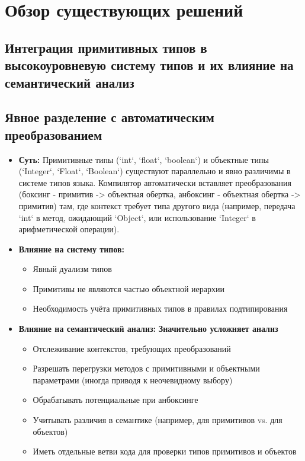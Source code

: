 \section{Обзор существующих решений}
\label{sec:Chapter2} 

\subsection*{Интеграция примитивных типов в высокоуровневую систему типов и их влияние на семантический анализ}

\subsection{Явное разделение с автоматическим преобразованием}

\begin{itemize}[label={--}]
    \item \textbf{Суть:} Примитивные типы (`int`, `float`, `boolean`) и объектные типы (`Integer`, `Float`, `Boolean`) существуют параллельно и явно различимы в системе типов языка. Компилятор автоматически вставляет преобразования (боксинг - примитив -> объектная обертка, анбоксинг - объектная обертка -> примитив) там, где контекст требует типа другого вида (например, передача `int` в метод, ожидающий `Object`, или использование `Integer` в арифметической операции).

    \item \textbf{Влияние на систему типов:}
    \begin{itemize}
        \item Явный дуализм типов
        \item Примитивы не являются частью объектной иерархии
        \item Необходимость учёта примитивных типов в правилах подтипирования
    \end{itemize}

    \item \textbf{Влияние на семантический анализ:}
    \textbf{Значительно усложняет анализ}
    \begin{itemize}[label={--}]
        \item Отслеживание контекстов, требующих преобразований
        \item Разрешать перегрузки методов с примитивными и объектными параметрами (иногда приводя к неочевидному выбору)
        \item Обрабатывать потенциальные  при анбоксинге 
        \item Учитывать различия в семантике (например,  \code{==} для примитивов vs. для объектов)
        \item Иметь отдельные ветви кода для проверки типов примитивов и объектов
    \end{itemize}


\end{itemize}
